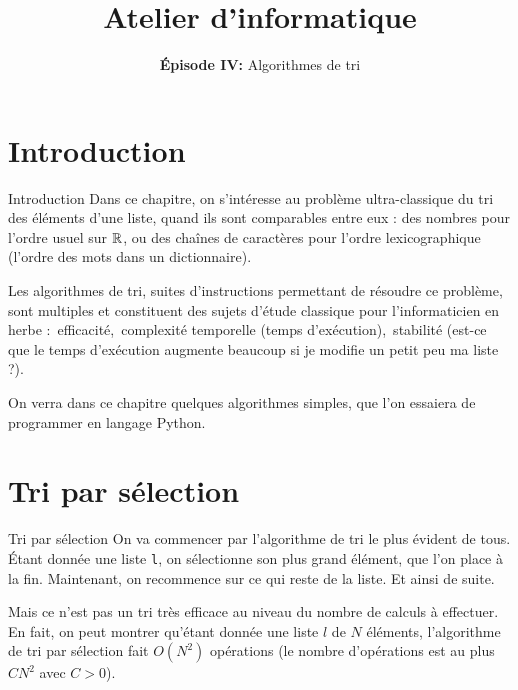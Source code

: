 

\title{Atelier d'informatique}
\subtitle{\textbf{Épisode IV:} Algorithmes de tri}



\begin{frame}
	\titlepage
\end{frame}

\frame{\tableofcontents}

\setlength\parskip{0.8em}
\section{Introduction}

\begin{frame}{Introduction}
	Dans ce chapitre, on s'intéresse au problème ultra-classique du tri des éléments d'une liste, quand ils sont comparables entre eux : des nombres pour l'ordre usuel sur $\mathbb R$, ou des chaînes de caractères pour l'ordre lexicographique (l'ordre des mots dans un dictionnaire).
	\pause
	
	Les algorithmes de tri, suites d'instructions permettant de résoudre ce problème, sont multiples et constituent des sujets d'étude classique pour l'informaticien en herbe :\pause\, efficacité,\pause\, complexité temporelle (temps d'exécution),\pause\, stabilité (est-ce que le temps d'exécution augmente beaucoup si je modifie un petit peu ma liste ?).
	\pause
	
	On verra dans ce chapitre quelques algorithmes simples, que l'on essaiera de programmer en langage Python.
\end{frame}

\section{Tri par sélection}

\begin{frame}{Tri par sélection}
	On va commencer par l'algorithme de tri le plus évident de tous. Étant donnée une liste \lstinline|l|, on sélectionne son plus grand élément, que l'on place à la fin. Maintenant, on recommence sur ce qui reste de la liste. Et ainsi de suite.
	\pause
	
	Mais ce n'est pas un tri très efficace au niveau du nombre de calculs à effectuer. En fait, on peut montrer qu'étant donnée une liste $l$ de $N$ éléments, l'algorithme de tri par sélection fait $O(N^2)$ opérations (le nombre d'opérations est au plus $CN^2$ avec $C > 0$).
\end{frame}

